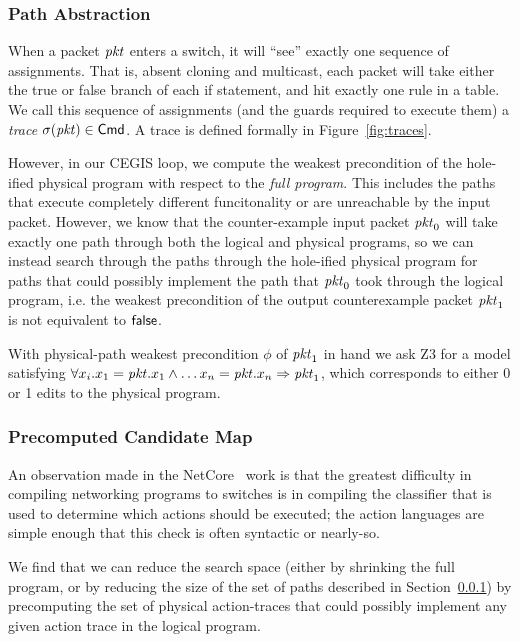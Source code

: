 \subsubsection{Path Abstraction}
\label{sec:path-abstraction}
When a packet $\mathit{pkt}$ enters a switch, it will ``see'' exactly one
sequence of assignments. That is, absent cloning and multicast, each
packet will take either the true or false branch of each if statement,
and hit exactly one rule in a table. We call this sequence of
assignments (and the guards required to execute them) a \emph{trace}
$\sigma(\mathit{pkt}) \in \mathsf{Cmd}$. A trace is defined formally in
Figure~\ref{fig:traces}.

However, in our CEGIS loop, we compute the weakest precondition of the
hole-ified physical program with respect to the \emph{full
  program}. This includes the paths that execute completely different
funcitonality or are unreachable by the input packet. However, we know
that the counter-example input packet $\mathit{pkt}_0$ will take exactly one
path through both the logical and physical programs, so we can instead
search through the paths through the hole-ified physical program for
paths that could possibly implement the path that $\mathit{pkt}_0$ took
through the logical program, i.e. the weakest precondition of the
output counterexample packet $\mathit{pkt}_1$ is not equivalent to $\mathsf{false}$.

With physical-path weakest precondition $\phi$ of $\mathit{pkt}_1$ in hand we
ask Z3 for a model satisfying
$\forall x_i. x_1 = \mathit{pkt}.x_1 \wedge \ldots x_n = \mathit{pkt}.x_n \Rightarrow
\mathit{pkt}_1$, which corresponds to either 0 or 1 edits to the physical
program.

\subsubsection{Precomputed Candidate Map}
\label{sec:candidate-map}
An observation made in the NetCore~\cite{} work is that the greatest
difficulty in compiling networking programs to switches is in
compiling the classifier that is used to determine which actions
should be executed; the action languages are simple enough that this
check is often syntactic or nearly-so.

We find that we can reduce the search space (either by shrinking the
full program, or by reducing the size of the set of paths described in
Section~\ref{sec:path-abstraction}) by precomputing the set of
physical action-traces that could possibly implement any given action
trace in the logical program.

